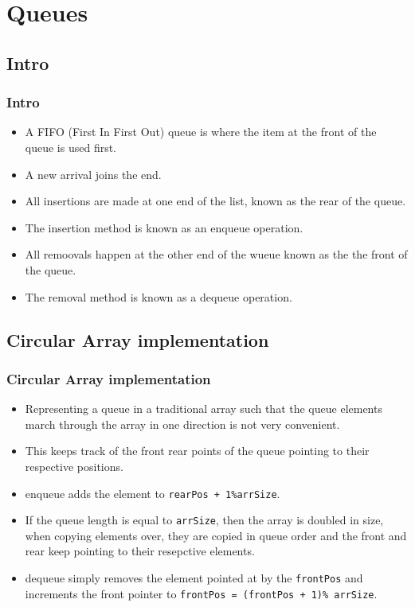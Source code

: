 \documentclass{beamer}
\begin{document}
\section{Queues}
\subsection{Intro}
\begin{frame}
\frametitle{Intro}
\begin{itemize}
\item A {\color{green}FIFO (First In First Out)} queue is where the item at the front of the queue is used first.
\item A new arrival joins the end.
\item All insertions are made at one end of the list, known as the {\color{red} rear of the queue}. 
\item The insertion method is known as an {\color{orange} enqueue} operation.
\item All remoovals happen at the other end of the wueue known as the {\color{purple} the front of the queue}. 
\item The removal method is known as a {\color{magenta} dequeue} operation.
\end{itemize}
\end{frame}
\subsection{Circular Array implementation}
\begin{frame}
\frametitle{Circular Array implementation}
\begin{itemize}
\item Representing a queue in a traditional array such that the queue elements march through the array in one direction is not very convenient.
\item This keeps track of the front rear points of the queue pointing to their respective positions.
\item {\color{orange} enqueue} adds the element to \texttt{rearPos + 1\%arrSize}.
\item If the queue length is equal to \texttt{arrSize}, then the array is doubled in size, when copying elements over, they are copied in queue order and the front and rear keep pointing to their resepctive elements.
\item {\color{magenta} dequeue} simply removes the element pointed at by the \texttt{frontPos} and increments the front pointer to \texttt{frontPos = (frontPos + 1)\% arrSize}.
\end{itemize}
\end{frame}
\end{document}
